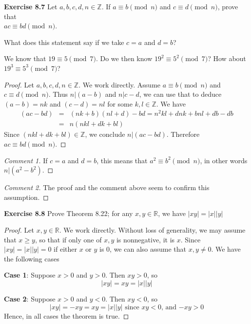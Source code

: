 \documentclass[12pt,oneside]{article}
\newenvironment{exercise}[1]{\vspace{.1in}\noindent\textbf{Exercise #1 \hspace{.05em}}}{}
\newcommand{\R}{\mathbb{R}}
\newcommand{\Z}{\mathbb{Z}}
\renewcommand{\mod}[3]{#1 \equiv #2 \pmod{#3}}
\begin{document}

\begin{exercise}{8.7}
Let $a,b,c,d,n \in \Z$. If $\mod{a}{b}{n}$ and $\mod{c}{d}{n}$, prove that \\ $\mod{ac}{bd}{n}$.

What does this statement say if we take $c = a$ and $d = b$?

We know that $\mod{19}{5}{7}$. Do we then know $\mod{19^2}{5^2}{7}$? How about \\ $\mod{19^3}{5^3}{7}$?
\end{exercise}

\begin{proof}
Let $a,b,c,d,n \in \Z$. We work directly. Assume $\mod{a}{b}{n}$ and $\mod{c}{d}{n}$. Thus $n|(a-b)$ and $n|c-d$, we can use that to deduce $(a-b)=nk$ and $(c-d)=nl$ for some $k, l \in \Z$. We have
\begin{eqnarray*}
(ac - bd) &=& (nk + b)(nl + d) - bd = n^2kl + dnk + bnl + db - db \\
&=& n(nkl + dk + bl)
\end{eqnarray*}
Since $(nkl + dk + bl) \in \Z$, we conclude $n|(ac - bd)$. Therefore $\mod{ac}{bd}{n}$.
\end{proof}

\begin{proof}[Comment 1]
If $c = a$ and $d = b$, this means that $\mod{a^2}{b^2}{n}$, in other words  \\ $n|(a^2 - b^2)$.
\end{proof}

\begin{proof}[Comment 2]
The proof and the comment above seem to confirm this assumption.
\end{proof}


\begin{exercise}{8.8}
Prove Theorem 8.22; for any $x,y \in \R$, we have $|xy|=|x||y|$
\end{exercise}

\begin{proof}
Let $x,y \in \R$. We work directly. Without loss of generality, we may assume that $x \geq y$, so that if only one of $x,y$ is nonnegative, it is $x$. Since $|xy|=|x||y|=0$ if either $x$ or $y$ is $0$, we can also assume that $x,y \not= 0$. We have the following cases

\textbf{Case 1}: Suppose $x > 0$ and $y > 0$. Then $xy > 0$, so
\[|xy| = xy = |x||y|\]

\textbf{Case 2}: Suppose $x > 0$ and $y < 0$. Then $xy < 0$, so
\[|xy|= -xy = xy = |x||y| \text{ since $xy < 0$, and $-xy > 0$}\]
Hence, in all cases the theorem is true.
\end{proof}
\end{document}
